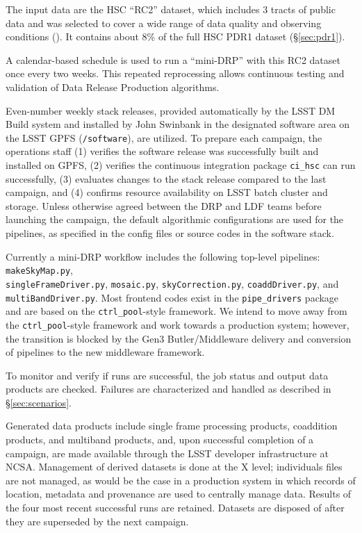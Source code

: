 \documentclass[DM,authoryear,toc]{lsstdoc}
\begin{document}
The input data are the HSC “RC2” dataset, which includes 3 tracts
of public data and was selected to cover a wide range of data quality
and observing conditions (). It contains about 8\% of the
full HSC PDR1 dataset (\S \ref{sec:pdr1}).

A calendar-based schedule is used to run a “mini-DRP” with this RC2
dataset once every two weeks. This repeated reprocessing allows
continuous testing and validation of Data Release Production
algorithms.

Even-number weekly stack releases, provided automatically by the
LSST DM Build system and installed by John Swinbank in the designated
software area on the LSST GPFS (\texttt{/software}), are utilized.
To prepare each campaign, the operations staff (1) verifies the
software release was successfully built and installed on GPFS, (2)
verifies the continuous integration package \texttt{ci\_hsc}
can run successfully, (3) evaluates changes to the stack release
compared to the last campaign, and (4) confirms resource availability
on LSST batch cluster and storage. Unless otherwise agreed between
the DRP and LDF teams before launching the campaign, the default
algorithmic configurations are used for the pipelines, as specified
in the config files or source codes in the software stack.

Currently a mini-DRP workflow includes the following top-level pipelines:
\texttt{makeSkyMap.py},\\ \texttt{singleFrameDriver.py}, \texttt{mosaic.py},
\texttt{skyCorrection.py}, \texttt{coaddDriver.py}, and
\texttt{multiBandDriver.py}. Most frontend codes exist in the
\texttt{pipe\_drivers} package and are based on the \texttt{ctrl\_pool}-style
framework. We intend to move away from the \texttt{ctrl\_pool}-style framework
and work towards a production system; however, the transition is
blocked by the Gen3 Butler/Middleware delivery and conversion of
pipelines to the new middleware framework.

To monitor and verify if runs are successful, the job status and
output data products are checked. Failures are characterized and
handled as described in \S \ref{sec:scenarios}.

Generated data products include single frame processing products,
coaddition products, and multiband products, and, upon successful
completion of a campaign, are made available through the LSST
developer infrastructure at NCSA. Management of derived datasets
is done at the X level; individuals files are not managed, as would
be the case in a production system in which records of location,
metadata and provenance are used to centrally manage data. Results
of the four most recent successful runs are retained.  Datasets are
disposed of after they are superseded by the next campaign.
\end{document}
